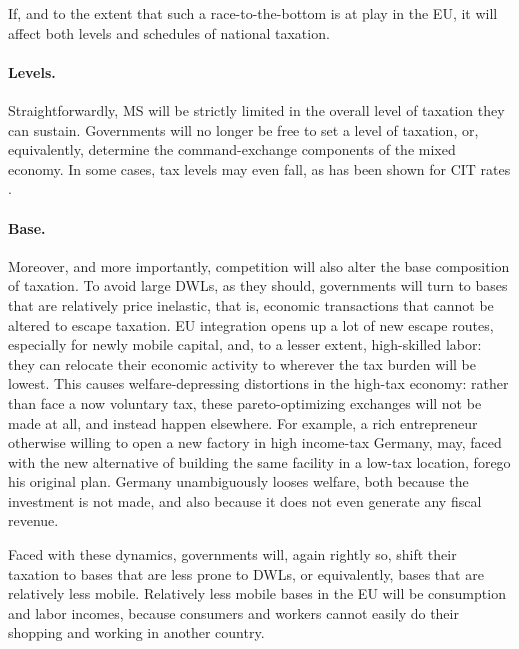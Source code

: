 \documentclass[11pt,a4paper,oneside,openright]{article}
\begin{document}


If, and to the extent that such a race-to-the-bottom is at play in the \gls{EU}, it will affect both levels and schedules of national taxation.

\paragraph{Levels.} Straightforwardly, \gls{MS} will be strictly limited in the overall level of taxation they can sustain. Governments will no longer be free to set a level of taxation, or, equivalently, determine the command-exchange components of the mixed economy. In some cases, tax levels may even fall, as has been shown for \gls{CIT} rates \citep{Piatkowski2008}.


\paragraph{Base.} Moreover, and more importantly, competition will also alter the base composition of taxation. To avoid large \glspl{DWL}, as they should, governments will turn to bases that are relatively price inelastic, that is, economic transactions that cannot be altered to escape taxation. \gls{EU} integration opens up a lot of new escape routes, especially for newly mobile capital, and, to a lesser extent, high-skilled labor: they can relocate their economic activity to wherever the tax burden will be lowest. This causes welfare-depressing distortions in the high-tax economy: rather than face a now voluntary tax, these pareto-optimizing exchanges will not be made at all, and instead happen elsewhere. For example, a rich entrepreneur otherwise willing to open a new factory in high income-tax Germany, may, faced with the new alternative of building the same facility in a low-tax location, forego his original plan. Germany unambiguously looses welfare, both because the investment is not made, and also because it does not even generate any fiscal revenue.

Faced with these dynamics, governments will, again rightly so, shift their taxation to bases that are less prone to \glspl{DWL}, or equivalently, bases that are relatively less mobile. Relatively less mobile bases in the \gls{EU} will be consumption and labor incomes, because consumers and workers cannot easily do their shopping and working in another country. 
\end{document}
